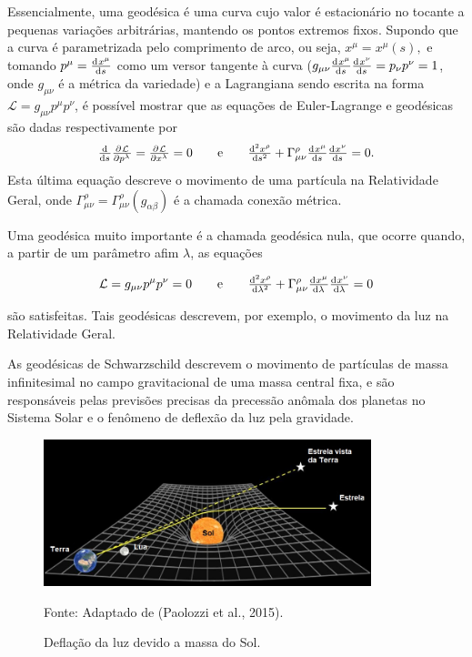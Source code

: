 \documentclass[a4,11pt]{report}
\begin{document}
Essencialmente, uma geodésica é uma curva cujo valor é estacionário no tocante a pequenas variações arbitrárias, mantendo os pontos extremos fixos. Supondo que a curva é parametrizada pelo comprimento de arco, ou seja, $x^\mu = x^\mu(s),$ e tomando $p^\mu = \od{x^\mu}{s}$ como um versor tangente à curva ($g_{\mu \nu} \od{x^\mu}{s} \od{x^\nu}{s} = p_\nu p^\nu = 1$, onde $g_{\mu\nu}$ é a métrica da variedade) e a Lagrangiana sendo escrita na forma $\mathcal{L} = g_{\mu \nu} p^\mu p^\nu$, é possível mostrar que as equações de Euler-Lagrange e geodésicas  são dadas respectivamente por
\[\od{}{s} \pd{\mathcal{L}}{{p^{\lambda}}} = \pd{\mathcal{L}}{{x^\lambda}} = 0 \qquad \mathrm{e} \qquad
\od[2]{{x^\rho}}{s} + \Gamma^{\rho}_{\mu \nu} \od{{x^{\mu}}}{s} \od{{x^{\nu}}}{s} = 0.\]
Esta última equação descreve o movimento de uma partícula na Relatividade Geral, 
onde $ \Gamma^{\rho}_{\mu \nu} = \Gamma^{\rho}_{\mu \nu} (g_{\alpha\beta})$ é a chamada conexão métrica.

Uma geodésica muito importante é a chamada geodésica nula, que ocorre quando, a partir de um parâmetro afim $\lambda$, as equações

$$\mathcal{L} = g_{\mu \nu} p^\mu p^\nu = 0 \qquad \mathrm{e} \qquad \od[2]{{x^\rho}}{\lambda} + \Gamma^{\rho}_{\mu \nu} \od{{x^{\mu}}}{\lambda} \od{{x^{\nu}}}{\lambda} = 0$$  

\noindent são satisfeitas. Tais geodésicas descrevem, por exemplo, o movimento da luz na Relatividade Geral.

As geodésicas de Schwarzschild descrevem o movimento de partículas de massa infinitesimal no campo gravitacional de uma massa central fixa, e são responsáveis pelas previsões precisas da precessão anômala dos planetas no Sistema Solar e o fenômeno de deflexão da luz pela gravidade.

\begin{figure}[!h]
\begin{center}
\caption{Deflação da luz devido a massa do Sol.} \label{fig:02}
\includegraphics[width=0.85\textwidth]{defle.png}
\end{center}
Fonte: Adaptado de (Paolozzi et al., 2015).
\end{figure}
\end{document}

